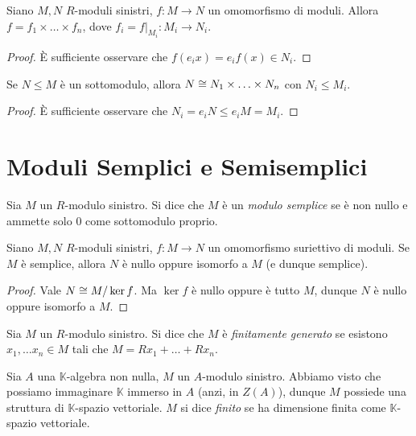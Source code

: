 \begin{corollary}
Siano $M,N$ $R$-moduli sinistri, $f:M\to N$ un omomorfismo di moduli. Allora $f=f_1\times\ldots\times f_n$, dove $f_i=f|_{M_i}:M_i\to N_i$.
\end{corollary}
\begin{proof}
È sufficiente osservare che $f(e_ix)=e_if(x)\in N_i$.
\end{proof}

\begin{corollary}
Se $N\le M$ è un sottomodulo, allora $N\cong N_1\times\ldots\times N_n$ con $N_i\le M_i$.
\end{corollary}
\begin{proof}
È sufficiente osservare che $N_i=e_iN\le e_iM=M_i$. 
\end{proof}


\section{Moduli Semplici e Semisemplici}

\begin{definition}
Sia $M$ un $R$-modulo sinistro. Si dice che $M$ è un \emph{modulo semplice} se è non nullo e ammette solo $0$ come sottomodulo proprio.
\end{definition}

\begin{proposition}
Siano $M,N$ $R$-moduli sinistri, $f:M\to N$ un omomorfismo suriettivo di moduli. Se $M$ è semplice, allora $N$ è nullo oppure isomorfo a $M$ (e dunque semplice).
\end{proposition}
\begin{proof}
Vale $N\cong M/\ker f$. Ma $\ker f$ è nullo oppure è tutto $M$, dunque $N$ è nullo oppure isomorfo a $M$.
\end{proof}


\begin{definition}
Sia $M$ un $R$-modulo sinistro. Si dice che $M$ è \emph{finitamente generato} se esistono $x_1,\ldots x_n\in M$ tali che $M=Rx_1+\ldots+Rx_n$.
\end{definition}

\begin{definition}
Sia $A$ una $\mathbb{K}$-algebra non nulla, $M$ un $A$-modulo sinistro. Abbiamo visto che possiamo immaginare $\mathbb{K}$ immerso in $A$ (anzi, in $Z(A)$), dunque $M$ possiede una struttura di $\mathbb{K}$-spazio vettoriale. $M$ si dice \emph{finito} se ha dimensione finita come $\mathbb{K}$-spazio vettoriale.
\end{definition}

